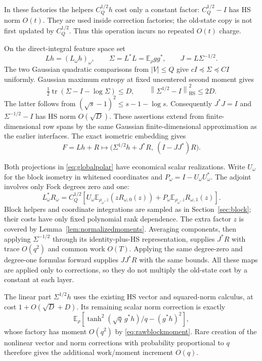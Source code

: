 \documentclass[11pt]{article}
\newcommand{\E}{\mathbb E}
\newcommand{\norm}[1]{\left\lVert #1\right\rVert}
\newcommand{\HS}{\mathrm{HS}}
\begin{document}
In these factories the helpers $C_Q^{1/2}h$ cost only a constant factor: $C_Q^{1/2}-I$ has HS norm $O(t)$. They are used inside correction factories; the old-state copy is not first updated by $C_Q^{1/2}$. Thus this operation incurs no repeated $O(t)$ charge.

On the direct-integral feature space set
\[
 Lh=(L_\omega h)_\omega,\qquad
 \Sigma=L^*L=\E_\rho gg^*,\qquad J=L\Sigma^{-1/2}.
\]
The two Gaussian quadratic comparisons from $|V|\le Q$ give
$cI\preceq\Sigma\preceq CI$ uniformly. Gaussian maximum entropy at fixed uncentered second moment gives
\[
 \tfrac12\operatorname{tr}(\Sigma-I-\log\Sigma)\le D,
 \qquad \norm{\Sigma^{1/2}-I}_{\HS}^2\le2D.
\]
The latter follows from $(\sqrt s-1)^2\le s-1-\log s$. Consequently $J^*J=I$ and $\Sigma^{-1/2}-I$ has HS norm $O(\sqrt D)$. These assertions extend from finite-dimensional row spans by the same Gaussian finite-dimensional approximation as the earlier interfaces. The exact isometric embedding gives
\begin{equation}
 F=Lh+R\longmapsto
 \bigl(\Sigma^{1/2}h+J^*R,\ (I-JJ^*)R\bigr).
 \label{eq:globalpolar}
\end{equation}

Both projections in \eqref{eq:globalpolar} have economical scalar realizations. Write $U_\omega$ for the block isometry in whitened coordinates and $P_\omega=I-U_\omega U_\omega^*$. The adjoint involves only Fock degrees zero and one:
\[
 L_\omega^*R_\omega
 =C_Q^{1/2}\left[
 U_\omega\E_{\rho_\omega,z}(zR_{\omega,0}(z))
 +P_\omega\E_{\rho_\omega,z}R_{\omega,1}(z)\right].
\]
Block helpers and coordinate integrations are sampled as in Section~\ref{sec:block}; their costs have only fixed polynomial rank dependence. The extra factor $z$ is covered by Lemma~\ref{lem:normalizedmoments}. Averaging components, then applying $\Sigma^{-1/2}$ through its identity-plus-HS representation, supplies $J^*R$ with trace $O(q^2)$ and common work $O(T)$. Applying the same degree-zero and degree-one formulas forward supplies $JJ^*R$ with the same bounds. All these maps are applied only to corrections, so they do not multiply the old-state cost by a constant at each layer.

The linear part $\Sigma^{1/2}h$ uses the existing HS vector and squared-norm calculus, at cost $1+O(\sqrt D+D)$. Its remaining scalar norm correction is exactly
\[
 \E_\rho\left[\tanh^2(\sqrt q\,g^*h)/q-(g^*h)^2\right],
\]
whose factory has moment $O(q^2)$ by \eqref{eq:rawblockmoment}. Rare creation of the nonlinear vector and norm corrections with probability proportional to $q$ therefore gives the additional work/moment increment $O(q)$.
\end{document}
